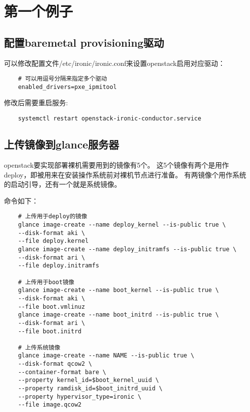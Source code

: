 \documentclass[a4paper,left=1.5cm,right=1.5cm,11pt]{article}
\begin{document}
\tableofcontents

\clearpage

\section{第一个例子}
\subsection{配置baremetal provisioning驱动}
	可以修改配置文件/etc/ironic/ironic.conf来设置openstack启用对应驱动：
	\begin{lstlisting}
	# 可以用逗号分隔来指定多个驱动
	enabled_drivers=pxe_ipmitool
	\end{lstlisting}

	修改后需要重启服务:
	\begin{lstlisting}
	systemctl restart openstack-ironic-conductor.service
	\end{lstlisting}

\subsection{上传镜像到glance服务器}
	openstack要实现部署裸机需要用到的镜像有5个。
	这5个镜像有两个是用作deploy，即被用来在安装操作系统前对裸机节点进行准备。
	有两镜像个用作系统的启动引导，还有一个就是系统镜像。\par

	命令如下：
	\begin{lstlisting}
	# 上传用于deploy的镜像
	glance image-create --name deploy_kernel --is-public true \
	--disk-format aki \
	--file deploy.kernel
	glance image-create --name deploy_initramfs --is-public true \
	--disk-format ari \
	--file deploy.initramfs

	# 上传用于boot镜像
	glance image-create --name boot_kernel --is-public true \
	--disk-format aki \
	--file boot.vmlinuz
	glance image-create --name boot_initrd --is-public true \
	--disk-format ari \
	--file boot.initrd

	# 上传系统镜像
	glance image-create --name NAME --is-public true \
	--disk-format qcow2 \
	--container-format bare \
	--property kernel_id=$boot_kernel_uuid \
	--property ramdisk_id=$boot_initrd_uuid \
	--property hypervisor_type=ironic \
	--file image.qcow2
	\end{lstlisting}
\end{document}
